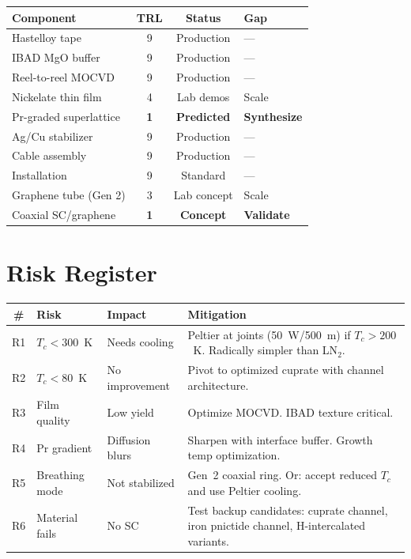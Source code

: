 \documentclass[11pt, a4paper]{article}
\begin{document}
\begin{center}
\begin{tabular}{@{}lccl@{}}
\toprule
\textbf{Component} & \textbf{TRL} & \textbf{Status} & \textbf{Gap} \\
\midrule
Hastelloy tape & 9 & Production & --- \\
IBAD MgO buffer & 9 & Production & --- \\
Reel-to-reel MOCVD & 9 & Production & --- \\
Nickelate thin film & 4 & Lab demos & Scale \\
Pr-graded superlattice & \textbf{1} & \textbf{Predicted} &
  \textbf{Synthesize} \\
Ag/Cu stabilizer & 9 & Production & --- \\
Cable assembly & 9 & Production & --- \\
Installation & 9 & Standard & --- \\
\midrule
Graphene tube (Gen 2) & 3 & Lab concept & Scale \\
Coaxial SC/graphene & \textbf{1} & \textbf{Concept} &
  \textbf{Validate} \\
\bottomrule
\end{tabular}
\end{center}

\section{Risk Register}

\begin{center}
\begin{tabular}{@{}cp{2.2cm}p{2cm}p{5.5cm}@{}}
\toprule
\textbf{\#} & \textbf{Risk} & \textbf{Impact} & \textbf{Mitigation} \\
\midrule
R1 & $T_c < 300$~K & Needs cooling & Peltier at joints (50~W/500~m)
    if $T_c > 200$~K. Radically simpler than LN$_2$. \\
R2 & $T_c < 80$~K & No improvement & Pivot to optimized cuprate with
    channel architecture. \\
R3 & Film quality & Low yield & Optimize MOCVD. IBAD texture critical. \\
R4 & Pr gradient & Diffusion blurs & Sharpen with interface buffer.
    Growth temp optimization. \\
R5 & Breathing mode & Not stabilized & Gen~2 coaxial ring. Or: accept
    reduced $T_c$ and use Peltier cooling. \\
R6 & Material fails & No SC & Test backup candidates: cuprate channel,
    iron pnictide channel, H-intercalated variants. \\
\bottomrule
\end{tabular}
\end{center}
\end{document}
